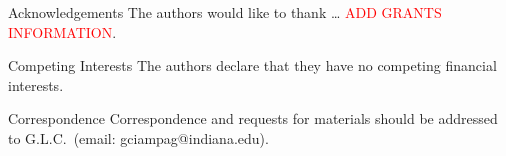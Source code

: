 \documentclass[10pt, letterpaper, english]{nature}
\begin{document}
\begin{addendum}
\item[Acknowledgements] The authors would like to thank \dots
    \textcolor{red}{ADD GRANTS INFORMATION}.
 \item[Competing Interests] The authors declare that they have no
competing financial interests.
 \item[Correspondence] Correspondence and requests for materials
should be addressed to G.L.C.~(email: gciampag@indiana.edu).
\end{addendum}

% 
% 
% 
% 
% 
% 
% 
% 
% 
% 
% 
% 
% 
% 
% 
% 
% 
% 
% 
% 


\end{document}
